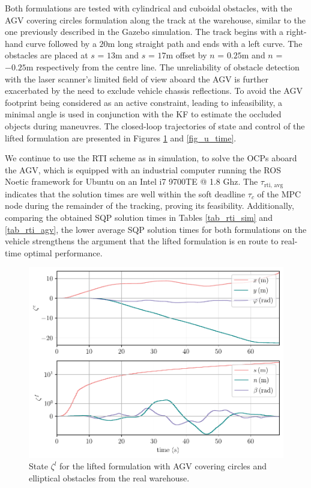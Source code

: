 Both formulations are tested with cylindrical and cuboidal obstacles, with the \ac{AGV} covering circles formulation along the track at the warehouse, similar to the one previously described in the Gazebo simulation. The track begins with a right-hand curve followed by a $20 \mathrm{m}$ long straight path and ends with a left curve. The obstacles are placed at $s$ = $13 \mathrm{m}$ and $s$ = $17\mathrm{m}$ offset by $n$ = $0.25 \mathrm{m}$ and $n$ = $-0.25 \mathrm{m}$ respectively from the centre line. The unreliability of obstacle detection with the laser scanner's limited field of view aboard the \ac{AGV} is further exacerbated by the need to exclude vehicle chassis reflections. To avoid the \ac{AGV} footprint being considered as an active constraint, leading to infeasibility, a minimal angle is used in conjunction with the \ac{KF} to estimate the occluded objects during maneuvres. The closed-loop trajectories of state and control of the lifted formulation are presented in Figures \ref{fig_zeta_time} and \ref{fig_u_time}.
\par We continue to use the RTI scheme as in simulation, to solve the \ac{OCP}s aboard the \ac{AGV}, which is equipped with an industrial computer running the \ac{ROS} Noetic framework for Ubuntu on an Intel i7 9700TE @ 1.8 Ghz. The $\tau_{\mathrm{rti,\,avg}}$ indicates that the solution times are well within the soft deadline $\tau_{c}$ of the MPC node during the remainder of the tracking, proving its feasibility. Additionally, comparing the obtained SQP solution times in Tables \ref{tab_rti_sim} and \ref{tab_rti_agv}, the lower average SQP solution times for both formulations on the vehicle strengthens the argument that the lifted formulation is en route to real-time optimal performance.
\begin{figure}[h!tb]
    \includegraphics[width=1\textwidth]{figures/experiments/zeta_time}
    \caption{State $\zeta^{l}$ for the lifted formulation with \ac{AGV} covering circles and elliptical obstacles from the real warehouse.}  \label{fig_zeta_time}
\end{figure}
